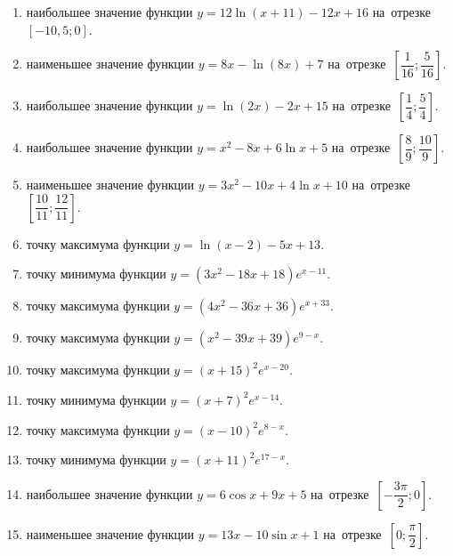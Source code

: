 \documentclass[a4paper,10pt]{article}
\begin{document}
\begin{enumerate}
\item {} наибольшее значение функции $y = 12\ln \left(x+11\right)-12x +16$ на~отрезке~$\left[-10,5;0\right]$.

\item {} наименьшее значение функции $y = 8x-\ln \left(8x\right)+7$ на~отрезке~$\left[\dfrac{1}{16};\dfrac{5}{16}\right]$.

\item {} наибольшее значение функции $y = \ln \left(2x\right)-2x+15$ на~отрезке~$\left[\dfrac{1}{4};\dfrac{5}{4}\right]$.

\item {} наибольшее значение функции $y=x^2-8x+6\ln x+5$ на~отрезке~$\left[\dfrac{8}{9};\dfrac{10}{9}\right]$.

\item {} наименьшее значение функции $y=3x^2-10x+4\ln x+10$ на~отрезке~$\left[\dfrac{10}{11};\dfrac{12}{11}\right]$.

\item {} точку максимума функции $y=\ln \left(x-2\right)-5x+13$.

\item {} точку минимума функции $y=\left(3x^2-18x+18\right)e^{x-11}$.

\item {} точку максимума функции $y=\left(4x^2-36x+36\right)e^{x+33}$.

\item {} точку максимума функции $y=\left(x^2-39x+39\right)e^{9-x}$.

\item {} точку максимума функции $y=\left(x +15\right)^2e^{x-20}$.

\item {} точку минимума функции $y=\left(x +7\right)^2e^{x-14}$.

\item {} точку максимума функции $y=\left(x -10\right)^2e^{8-x}$.

\item {} точку минимума функции $y=\left(x +11\right)^2e^{17-x}$.

\item {} наибольшее значение функции $y=6\cos x+9x +5$ на~отрезке~$\left[-\dfrac{3\pi }{2};0\right]$.

\item {} наименьшее значение функции $y=13x-10\sin x +1$ на~отрезке~$\left[0;\dfrac{\pi }{2}\right]$.


\end{enumerate}
\end{document}
